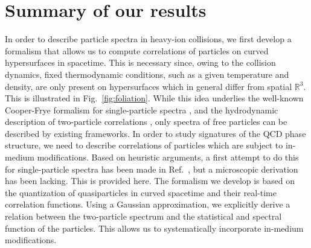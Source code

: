 \documentclass[reprint,superscriptaddress,english,preprintnumbers,amsmath,amssymb,aps,prx]{revtex4-2}
\def\Fig#1{Fig.~\ref{#1}}
\begin{document}
\section{Summary of our results}\label{sec:sum}

In order to describe particle spectra in heavy-ion collisions, we first develop a formalism that allows us to compute correlations of particles on curved hypersurfaces in spacetime. This is necessary since, owing to the collision dynamics, fixed thermodynamic conditions, such as a given temperature and density, are only present on hypersurfaces which in general differ from spatial $\mathbb{R}^3$. This is illustrated in \Fig{fig:foliation}. While this idea underlies the well-known Cooper-Frye formalism for single-particle spectra \cite{Cooper:1974mv}, and the hydrodynamic description of two-particle correlations \cite{Makhlin:1986fd}, only spectra of free particles can be described by existing frameworks. In order to study signatures of the QCD phase structure, we need to describe correlations of particles which are subject to in-medium modifications. Based on heuristic arguments, a first attempt to do this for single-particle spectra has been made in Ref.\ \cite{Pisarski:2021qof}, but a microscopic derivation has been lacking. This is provided here. The formalism we develop is based on the quantization of quasiparticles in curved spacetime and their real-time correlation functions. Using a Gaussian approximation, we explicitly derive a relation between the two-particle spectrum and the statistical and spectral function of the particles. This allows us to systematically incorporate in-medium modifications. 
\end{document}
